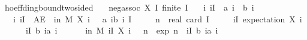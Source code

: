 \begin{isabelle_cm}
\isamarkupfalse%
\ hoeffding{\isacharunderscore}{\kern0pt}bound{\isacharunderscore}{\kern0pt}two{\isacharunderscore}{\kern0pt}sided{\isacharcolon}{\kern0pt}\isanewline
\ \ \ {\isacartoucheopen}neg{\isacharunderscore}{\kern0pt}assoc\ X\ I{\isacartoucheclose}\ {\isacartoucheopen}finite\ I{\isacartoucheclose}\isanewline
\ \ \ {\isacartoucheopen}{\isasymAnd}i{\isachardot}{\kern0pt}\ i{\isasymin}I\ {\isasymLongrightarrow}\ a\ i\ {\isasymle}\ b\ i{\isacartoucheclose}\isanewline
\ \ \ {\isacartoucheopen}{\isasymAnd}i{\isachardot}{\kern0pt}\ i{\isasymin}I\ {\isasymLongrightarrow}\ AE\ {\isasymomega}\ in\ M{\isachardot}{\kern0pt}\ X\ i\ {\isasymomega}\ {\isasymin}\ {\isacharbraceleft}{\kern0pt}a\ i{\isachardot}{\kern0pt}{\isachardot}{\kern0pt}b\ i{\isacharbraceright}{\kern0pt}{\isacartoucheclose}\ {\isacartoucheopen}I\ {\isasymnoteq}\ {\isacharbraceleft}{\kern0pt}{\isacharbraceright}{\kern0pt}{\isacartoucheclose}\isanewline
\ \ \ {\isacartoucheopen}n\ {\isasymequiv}\ real\ {\isacharparenleft}{\kern0pt}card\ I{\isacharparenright}{\kern0pt}{\isacartoucheclose}\isanewline
\ \ \ {\isacartoucheopen}{\isasymmu}\ {\isasymequiv}\ {\isacharparenleft}{\kern0pt}{\isasymSum}i{\isasymin}I{\isachardot}{\kern0pt}\ expectation\ {\isacharparenleft}{\kern0pt}X\ i{\isacharparenright}{\kern0pt}{\isacharparenright}{\kern0pt}{\isacartoucheclose}\isanewline
\ \ \ {\isacartoucheopen}{\isasymdelta}\ {\isasymge}\ {}{\isacartoucheclose}\ {\isacartoucheopen}{\isacharparenleft}{\kern0pt}{\isasymSum}i{\isasymin}I{\isachardot}{\kern0pt}\ {\isacharparenleft}{\kern0pt}b\ i{\isacharminus}{\kern0pt}a\ i{\isacharparenright}\ {\isachargreater}{\kern0pt}\ {}{\isacartoucheclose}\isanewline
\ \ \ {\isacartoucheopen}{\isasymP}{\isacharparenleft}{\kern0pt}{\isasymomega}\ in\ M{\isachardot}{\kern0pt}\ {\isasymbar}{\isacharparenleft}{\kern0pt}{\isasymSum}i{\isasymin}I{\isachardot}{\kern0pt}\ X\ i\ {\isasymomega}{\isacharparenright}{\kern0pt}{\isacharminus}{\kern0pt}{\isasymmu}{\isasymbar}\ {\isasymge}\ {\isasymdelta}{\isacharasterisk}{\kern0pt}n{\isacharparenright}{\kern0pt}\ {\isasymle}\ {}{\isacharasterisk}{\kern0pt}exp\ {\isacharparenleft}{\kern0pt}{\isacharminus}{\kern0pt}{}{\isacharasterisk}{\kern0pt}{\isacharparenleft}{\kern0pt}n{\isacharasterisk}{\kern0pt}{\isasymdelta}{\isacharparenright}{\kern0pt}\ {\isacharslash}{\kern0pt}\ {\isacharparenleft}{\kern0pt}{\isasymSum}i{\isasymin}I{\isachardot}{\kern0pt}\ {\isacharparenleft}{\kern0pt}b\ i{\isacharminus}{\kern0pt}a\ i{\isacharparenright}
\end{isabelle_cm}
